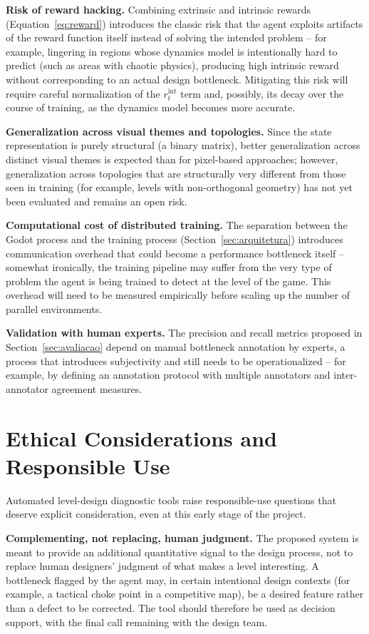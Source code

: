 \documentclass[sigconf,nonacm,language=english]{acmart}
\begin{document}
\textbf{Risk of reward hacking.} Combining extrinsic and intrinsic rewards
(Equation~\eqref{eq:reward}) introduces the classic risk that the agent
exploits artifacts of the reward function itself instead of solving the
intended problem -- for example, lingering in regions whose dynamics model
is intentionally hard to predict (such as areas with chaotic physics),
producing high intrinsic reward without corresponding to an actual design
bottleneck. Mitigating this risk will require careful normalization of the
$r^{\text{int}}_t$ term and, possibly, its decay over the course of
training, as the dynamics model becomes more accurate.

\textbf{Generalization across visual themes and topologies.} Since the
state representation is purely structural (a binary matrix), better
generalization across distinct visual themes is expected than for
pixel-based approaches; however, generalization across topologies that are
structurally very different from those seen in training (for example,
levels with non-orthogonal geometry) has not yet been evaluated and remains
an open risk.

\textbf{Computational cost of distributed training.} The separation
between the Godot process and the training process (Section~\ref{sec:arquitetura})
introduces communication overhead that could become a performance
bottleneck itself -- somewhat ironically, the training pipeline may suffer
from the very type of problem the agent is being trained to detect at the
level of the game. This overhead will need to be measured empirically
before scaling up the number of parallel environments.

\textbf{Validation with human experts.} The precision and recall metrics
proposed in Section~\ref{sec:avaliacao} depend on manual bottleneck
annotation by experts, a process that introduces subjectivity and still
needs to be operationalized -- for example, by defining an annotation
protocol with multiple annotators and inter-annotator agreement measures.

\section{Ethical Considerations and Responsible Use}
\label{sec:etica}

Automated level-design diagnostic tools raise responsible-use questions
that deserve explicit consideration, even at this early stage of the
project.

\textbf{Complementing, not replacing, human judgment.} The proposed system
is meant to provide an additional quantitative signal to the design
process, not to replace human designers' judgment of what makes a level
interesting. A bottleneck flagged by the agent may, in certain intentional
design contexts (for example, a tactical choke point in a competitive map),
be a desired feature rather than a defect to be corrected. The tool should
therefore be used as decision support, with the final call remaining with
the design team.
\end{document}
